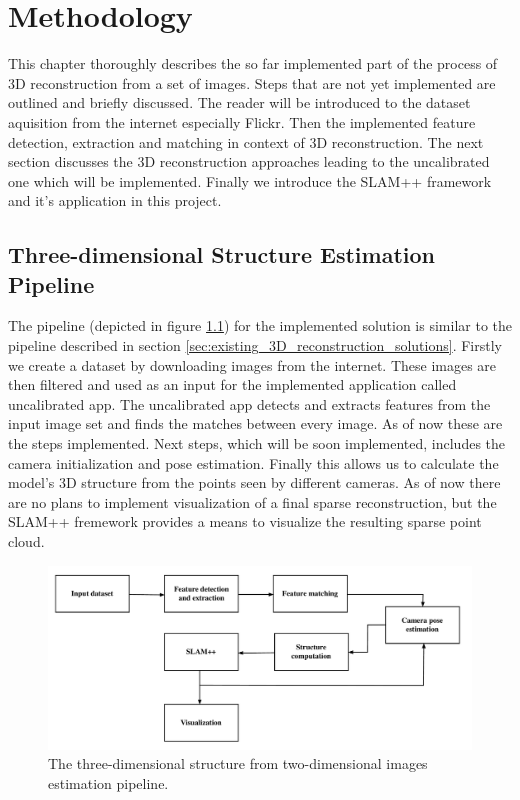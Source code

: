 \chapter{Methodology}
\label{chapter:methodology}
This chapter thoroughly describes the so far implemented part of the process of 3D reconstruction from a set of images. Steps that are not yet implemented are outlined and briefly discussed. The reader will be introduced to the dataset aquisition from the internet especially Flickr. Then the implemented feature detection, extraction and matching in context of 3D reconstruction. The next section discusses the 3D reconstruction approaches leading to the uncalibrated one which will be implemented. Finally we introduce the SLAM++ framework and it's application in this project. 

\section{Three-dimensional Structure Estimation Pipeline}
The pipeline (depicted in figure \ref{fig:pipeline}) for the implemented solution is similar to the pipeline described in section \ref{sec:existing_3D_reconstruction_solutions}. Firstly we create a dataset by downloading images from the internet. These images are then filtered and used as an input for the implemented application called uncalibrated app. The uncalibrated app detects and extracts features from the input image set and finds the matches between every image. As of now these are the steps implemented. Next steps, which will be soon implemented, includes the camera initialization and pose estimation. Finally this allows us to calculate the model's 3D structure from the points seen by different cameras. As of now there are no plans to implement visualization of a final sparse reconstruction, but the SLAM++ fremework provides a means to visualize the resulting sparse point cloud. 

\begin{figure}[ht]
	\begin{center}
		\includegraphics[keepaspectratio,width=\textwidth]{fig/pipeline.pdf}
	\end{center}
	\caption{The three-dimensional structure from two-dimensional images estimation pipeline.}
	\label{fig:pipeline}
\end{figure}

